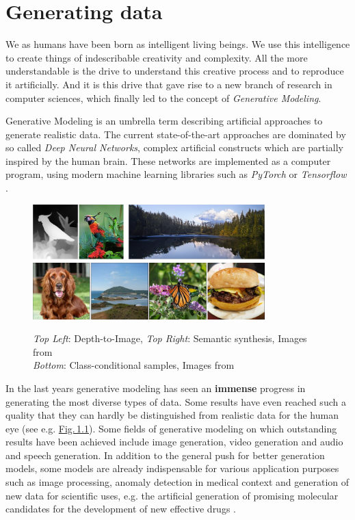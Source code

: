 
\section{Generating data} \label{sec:1.1}
\thispagestyle{plain}
We as humans have been born as intelligent living beings. We use this intelligence to create things of indescribable creativity and complexity. All the more understandable is the drive to understand this creative process and to reproduce it artificially. And it is this drive that gave rise to a new branch of research in computer sciences, which finally led to the concept of \textit{Generative Modeling}.

\thispagestyle{plain}
Generative Modeling is an umbrella term describing artificial approaches to generate realistic data. The current state-of-the-art approaches are dominated by so called \textit{Deep Neural Networks}, complex artificial constructs which are partially inspired by the human brain. These networks are implemented as a computer program, using modern machine learning libraries such as \textit{PyTorch} \cite{pytorch} or \textit{Tensorflow} \cite{tensorflow}.

%
\begin{figure}[] \label{fig:1.1}
    \centering
    \includegraphics[width=0.8\textwidth]{Chapters/figures/transformer.PNG}
    \includegraphics[width=0.8\textwidth]{Chapters/figures/biggan.PNG}
    \caption[Examples for state-of-the-art samples]{\textit{Top Left}: Depth-to-Image, \textit{Top Right}: Semantic synthesis, Images from \cite{taming}\\\textit{Bottom}: Class-conditional samples, Images from \cite{biggan}} 
\end{figure}
%
\thispagestyle{plain}
In the last years generative modeling has seen an \textbf{immense} progress in generating the most diverse types of data. Some results have even reached such a quality that they can hardly be distinguished from realistic data for the human eye (see e.g. \hyperref[fig:1.1]{Fig.\,1.1}). Some fields of generative modeling on which outstanding results have been achieved include image generation, video generation and audio and speech generation. In addition to the general push for better generation models, some models are already indispensable for various application purposes such as image processing, anomaly detection in medical context and generation of new data for scientific uses, e.g. the artificial generation of promising molecular candidates for the development of new effective drugs \cite{molgrad}.
\thispagestyle{plain}
